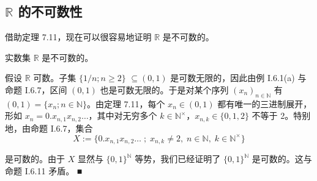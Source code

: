 \subsection*{$\mathbb{R}$ 的不可数性}

借助定理 7.11，现在可以很容易地证明 $ \mathbb{R} $ 是不可数的。

\begin{theorem}

实数集 $ \mathbb{R} $ 是不可数的。

\proofhead
假设 $\mathbb{R}$ 可数。子集 $\{1/n; n \geq 2\}$ $\subseteq (0,1)$ 是可数无限的，因此由例 I.6.1(a) 与命题 I.6.7，区间 $(0,1)$ 也是可数无限的。于是对某个序列 $(x_n)_{n \in \mathbb{N}}$ 有 $(0,1) = \{x_n; n \in \mathbb{N}\}$。由定理 7.11，每个 $x_n \in (0,1)$ 都有唯一的三进制展开，形如 $x_n = 0.x_{n,1}x_{n,2} \ldots$，其中对无穷多个 $k \in \mathbb{N}^\times$，$x_{n,k} \in \{0,1,2\}$ 不等于 2。特别地，由命题 I.6.7，集合
\[
X:=\{0.x_{n,1}x_{n,2}\ldots\;;\;x_{n,k}\neq2,\;n\in\mathbb{N},\;k\in\mathbb{N}^{\times}\}
\]

是可数的。由于 $X$ 显然与 $\{0,1\}^{\mathbb{N}}$ 等势，我们已经证明了 $\{0,1\}^{\mathbb{N}}$ 是可数的。这与命题 I.6.11 矛盾。 ■

\end{theorem}

\exerciseshead

